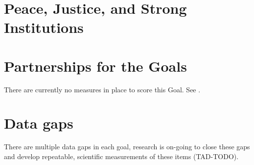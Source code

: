\documentclass[12pt]{article}
\begin{document}
\section{Peace, Justice, and Strong Institutions}



\section{Partnerships for the Goals}
There are currently no measures  in place to score this Goal. See .
\clearpage

\section{Data gaps}\label{sec:datagap}
There are multiple data gaps in each goal, research is on-going to close these gaps and develop repeatable, scientific measurements of these items (TAD-TODO).
\end{document}
